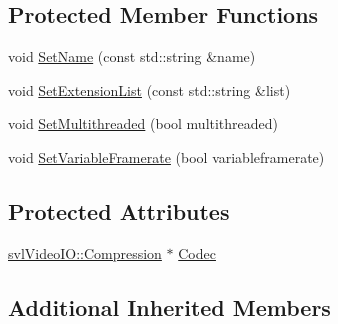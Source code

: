 \subsection*{Protected Member Functions}
\begin{DoxyCompactItemize}
\item 
void \hyperlink{classsvl_video_codec_base_a3dbf287cbcc392d853df920763e7f20e}{Set\-Name} (const std\-::string \&name)
\item 
void \hyperlink{classsvl_video_codec_base_a116a96046ad0f73d8fadc731fa17a17d}{Set\-Extension\-List} (const std\-::string \&list)
\item 
void \hyperlink{classsvl_video_codec_base_af202420146f050725a599f220f0f1c5a}{Set\-Multithreaded} (bool multithreaded)
\item 
void \hyperlink{classsvl_video_codec_base_aaa4d33f9909fa902999ab34292bee6c4}{Set\-Variable\-Framerate} (bool variableframerate)
\end{DoxyCompactItemize}
\subsection*{Protected Attributes}
\begin{DoxyCompactItemize}
\item 
\hyperlink{classsvl_video_i_o_a932d071ec9be4fefde824ab9b9125282}{svl\-Video\-I\-O\-::\-Compression} $\ast$ \hyperlink{classsvl_video_codec_base_a8a6e5b36251d67fbab74399ba965b46a}{Codec}
\end{DoxyCompactItemize}
\subsection*{Additional Inherited Members}


